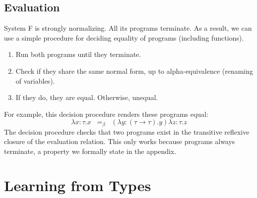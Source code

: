 \documentclass[acmsmall]{acmart}
\theoremstyle{mytheoremstyle}
\begin{document}
\subsection{Evaluation}
System F is strongly normalizing. All its programs terminate. As a result, we can use a simple procedure for deciding equality of programs (including functions). 
\begin{enumerate}
\item Run both programs until they terminate.
\item Check if they share the same normal form, up to alpha-equivalence (renaming of variables).
\item If they do, they are equal. Otherwise, unequal.
\end{enumerate}
For example, this decision procedure renders these programs equal:
$$\lambda x\!:\!\tau.x \;\;=_\beta\;\; (\lambda y\!:\!(\tau\to\tau).y)\lambda z\!:\!\tau.z$$
The decision procedure checks that two programs exist in the transitive reflexive closure of the evaluation relation. This only works because programs always terminate, a property we formally state in the appendix.

\section{Learning from Types}

\end{document}
